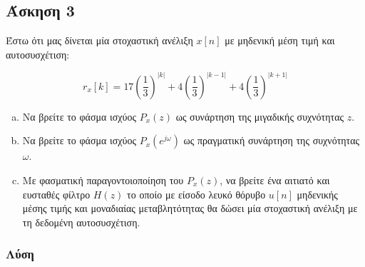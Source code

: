 \newpage\subsection*{Άσκηση 3}

Έστω ότι μας δίνεται μία στοχαστική ανέλιξη $x[n]$ με μηδενική μέση τιμή και αυτοσυσχέτιση:

\begin{equation*} r_x[k] = 17\left(\frac13\right)^{|k|} + 4\left(\frac13\right)^{|k-1|} + 4\left(\frac13\right)^{|k+1|} \end{equation*}

\begin{enumerate}[(a)]
\item
    Να βρείτε το φάσμα ισχύος $P_x(z)$ ως συνάρτηση της μιγαδικής συχνότητας $z$.
\item
    Να βρείτε το φάσμα ισχύος $P_x(e^{j\omega})$ ως πραγματική συνάρτηση της συχνότητας $\omega$.
\item
    Με φασματική παραγοντοιοποίηση του $P_x(z)$, να βρείτε ένα αιτιατό και ευσταθές φίλτρο $H(z)$ το οποίο με είσοδο λευκό θόρυβο $u[n]$ μηδενικής
    μέσης τιμής και μοναδιαίας μεταβλητότητας θα δώσει μία στοχαστική ανέλιξη με τη δεδομένη αυτοσυσχέτιση.
\end{enumerate}

\subsubsection*{Λύση}

